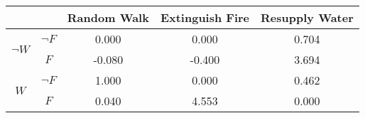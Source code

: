 \begin{center}
\begin{tabular}{|c|c|c|c|c|}
  \hline
  &   & Random Walk & Extinguish Fire & Resupply Water\\
  \hline
  \multirow{2}{*}{$\neg W$} & $\neg F$ & 0.000 & 0.000 & 0.704\\
  \cline{2-5}
   & $F$ & -0.080 & -0.400 & 3.694\\
  \hline
  \multirow{2}{*}{$W$} & $\neg F$ & 1.000 & 0.000 & 0.462\\
  \cline{2-5}
   & $F$ & 0.040 & 4.553 & 0.000\\
  \hline
\end{tabular}
\end{center}
